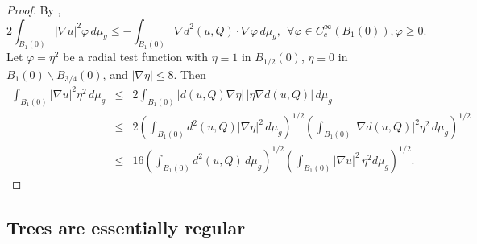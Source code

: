 \documentclass[12pt]{amsart}
\theoremstyle{definition}
\numberwithin{equation}{section}
\begin{document}
\begin{proof}
By \cite[Proposition 2.2]{gromov-schoen},
\[
2 \int_{B_1(0)} |\nabla u|^2 \varphi \, d\mu_g \leq - \int_{B_1(0)} \nabla d^2 (u,Q) \cdot \nabla \varphi  \, d\mu_g,\ \ \forall \varphi\in C^\infty_c(B_1(0)), \varphi \geq 0.
\]
Let  $\varphi=\eta^2$ be a radial test function with $\eta\equiv 1$ in $B_{1/2}(0)$, $\eta \equiv 0$ in $B_1(0) \backslash B_{3/4}(0)$, and $|\nabla \eta| \leq 8$.
Then
\begin{eqnarray*}
 \int_{B_1(0)} |\nabla u|^2 \eta^2  \, d\mu_g
& \leq &
2 \int_{B_1(0)} | d(u,Q) \nabla \eta |\,| \eta \nabla d(u,Q) |\, d\mu_g
\\
& \leq & 2\left( \int_{B_1(0)} d^2(u,Q) |\nabla \eta|^2  \, d\mu_g\right)^{1/2} \left( \int_{B_{1}(0)} |\nabla d(u,Q) |^2 \eta^2 \, d\mu_g\right)^{1/2}
\\
& \leq & 16 \left( \int_{B_1(0)} d^2(u,Q)\, d\mu_g\right)^{1/2} \left( \int_{B_{1}(0)} |\nabla u |^2\, \eta^2 d\mu_g\right)^{1/2}.
\end{eqnarray*}
\end{proof}



\subsection{Trees are essentially regular}
\end{document}
